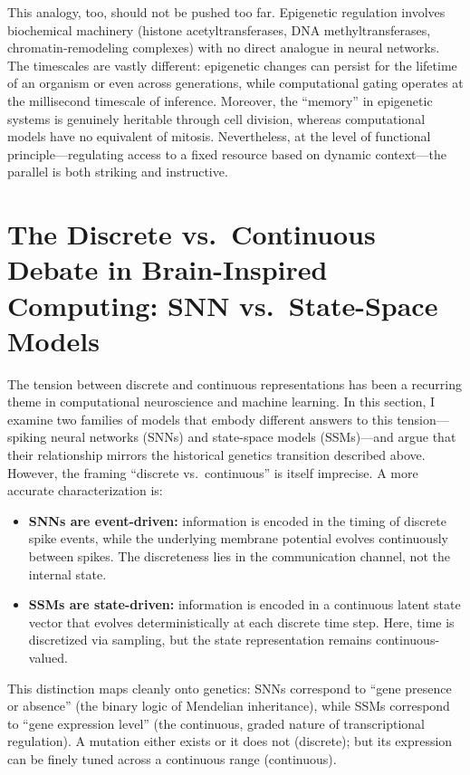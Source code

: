 \documentclass[12pt,a4paper]{article}
\begin{document}
This analogy, too, should not be pushed too far. Epigenetic regulation involves biochemical machinery (histone acetyltransferases, DNA methyltransferases, chromatin-remodeling complexes) with no direct analogue in neural networks. The timescales are vastly different: epigenetic changes can persist for the lifetime of an organism or even across generations, while computational gating operates at the millisecond timescale of inference. Moreover, the ``memory'' in epigenetic systems is genuinely heritable through cell division, whereas computational models have no equivalent of mitosis. Nevertheless, at the level of functional principle---regulating access to a fixed resource based on dynamic context---the parallel is both striking and instructive.

\section{The Discrete vs.\ Continuous Debate in Brain-Inspired Computing: SNN vs.\ State-Space Models}
\label{sec:snn}

The tension between discrete and continuous representations has been a recurring theme in computational neuroscience and machine learning. In this section, I examine two families of models that embody different answers to this tension---spiking neural networks (SNNs) and state-space models (SSMs)---and argue that their relationship mirrors the historical genetics transition described above. However, the framing ``discrete vs.\ continuous'' is itself imprecise. A more accurate characterization is:

\begin{itemize}[nosep]
    \item \textbf{SNNs are event-driven:} information is encoded in the timing of discrete spike events, while the underlying membrane potential evolves continuously between spikes. The discreteness lies in the communication channel, not the internal state.
    \item \textbf{SSMs are state-driven:} information is encoded in a continuous latent state vector that evolves deterministically at each discrete time step. Here, time is discretized via sampling, but the state representation remains continuous-valued.
\end{itemize}

This distinction maps cleanly onto genetics: SNNs correspond to ``gene presence or absence'' (the binary logic of Mendelian inheritance), while SSMs correspond to ``gene expression level'' (the continuous, graded nature of transcriptional regulation). A mutation either exists or it does not (discrete); but its expression can be finely tuned across a continuous range (continuous).
\end{document}
